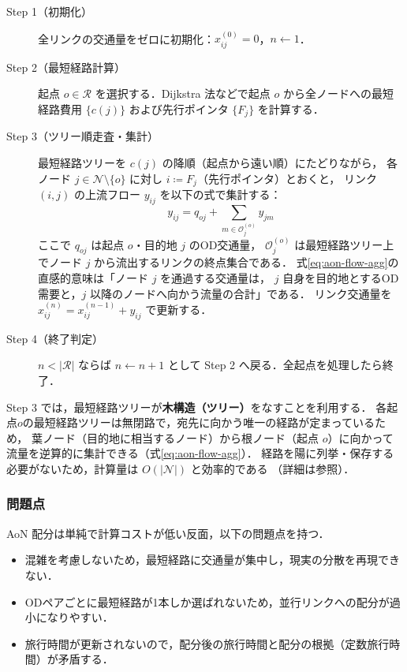 \begin{description}
  \item[\textsf{Step 1}（初期化）]
    全リンクの交通量をゼロに初期化：$x_{ij}^{(0)} = 0$，$n \leftarrow 1$．

  \item[\textsf{Step 2}（最短経路計算）]
    起点 $o \in \mathcal{R}$ を選択する．Dijkstra 法などで起点 $o$ から全ノードへの最短経路費用
    $\{c(j)\}$ および先行ポインタ $\{F_j\}$ を計算する．

  \item[\textsf{Step 3}（ツリー順走査・集計）]
    最短経路ツリーを $c(j)$ の降順（起点から遠い順）にたどりながら，
    各ノード $j \in \mathcal{N} \setminus \{o\}$ に対し $i \coloneqq F_j$（先行ポインタ）とおくと，
    リンク $(i,j)$ の上流フロー $y_{ij}$ を以下の式で集計する：
    \begin{equation}
      y_{ij} = q_{oj} + \sum_{m \in \mathcal{O}_j^{(o)}} y_{jm}
      \label{eq:aon-flow-agg}
    \end{equation}
    ここで $q_{oj}$ は起点 $o$・目的地 $j$ のOD交通量，
    $\mathcal{O}_j^{(o)}$ は最短経路ツリー上でノード $j$ から流出するリンクの終点集合である．
    式\eqref{eq:aon-flow-agg}の直感的意味は「ノード $j$ を通過する交通量は，
    $j$ 自身を目的地とするOD需要と，$j$ 以降のノードへ向かう流量の合計」である．
    リンク交通量を $x_{ij}^{(n)} = x_{ij}^{(n-1)} + y_{ij}$ で更新する．

  \item[\textsf{Step 4}（終了判定）]
    $n < |\mathcal{R}|$ ならば $n \leftarrow n+1$ として Step 2 へ戻る．全起点を処理したら終了．
\end{description}

Step 3 では，最短経路ツリーが\textbf{木構造（ツリー）}をなすことを利用する．
各起点$o$の最短経路ツリーは無閉路で，宛先に向かう唯一の経路が定まっているため，
葉ノード（目的地に相当するノード）から根ノード（起点 $o$）に向かって
流量を逆算的に集計できる（式\eqref{eq:aon-flow-agg}）．
経路を陽に列挙・保存する必要がないため，計算量は $O(|\mathcal{N}|)$ と効率的である
（詳細は参照）．

\subsubsection*{問題点}

AoN 配分は単純で計算コストが低い反面，以下の問題点を持つ．

\begin{itemize}
  \item 混雑を考慮しないため，最短経路に交通量が集中し，現実の分散を再現できない．
  \item ODペアごとに最短経路が1本しか選ばれないため，並行リンクへの配分が過小になりやすい．
  \item 旅行時間が更新されないので，配分後の旅行時間と配分の根拠（定数旅行時間）が矛盾する．
\end{itemize}

